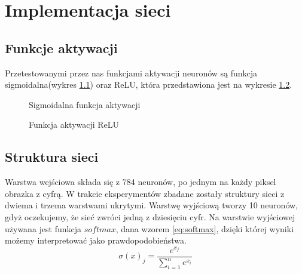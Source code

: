 {\let\clearpage\relax \chapter{Implementacja sieci}}
\section{Funkcje aktywacji}
Przetestowanymi przez nas funkcjami aktywacji neuronów są funkcja sigmoidalna(wykres \ref{fig:sig}) oraz ReLU, która przedstawiona jest na wykresie \ref{fig:relu}.

\begin{figure}
\centering
{}
\caption{Sigmoidalna funkcja aktywacji}
\label{fig:sig}
\end{figure}

\begin{figure}
\centering
{}
\caption{Funkcja aktywacji ReLU}
\label{fig:relu}
\end{figure}

\section{Struktura sieci}
Warstwa wejściowa składa się z 784 neuronów, po jednym na każdy piksel obrazka z cyfrą. W trakcie eksperymentów zbadane zostały struktury sieci z dwiema i trzema warstwami ukrytymi. Warstwę wyjściową tworzy 10 neuronów, gdyż oczekujemy, że sieć zwróci jedną z dziesięciu cyfr. Na warstwie wyjściowej używana jest funkcja $softmax$, dana wzorem \ref{eq:softmax}, dzięki której wyniki możemy interpretować jako prawdopodobieństwa.
\begin{equation} \label{eq:softmax}
\sigma(x)_j = \frac{e^{x_j}}{\sum\limits_{i=1}^n e^{x_i}}
\end{equation}

